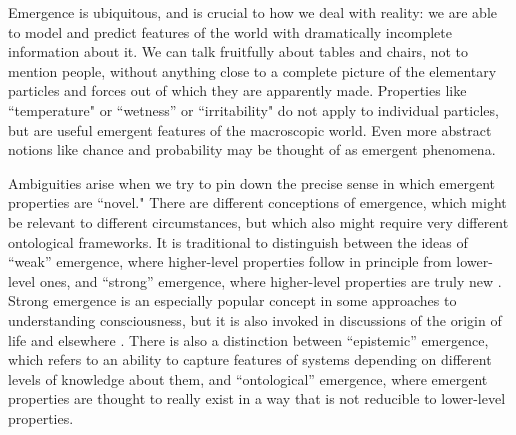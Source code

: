 \documentclass[12pt,english]{article}
\newcommand{\autocite}{\cite}
\begin{document}
Emergence is ubiquitous, and is crucial to how we deal with reality: we are able to model and predict features of the world with dramatically incomplete information about it.
We can talk fruitfully about tables and chairs, not to mention people, without anything close to a complete picture of the elementary particles and forces out of which they are apparently made.
Properties like ``temperature" or ``wetness'' or ``irritability" do not apply to individual particles, but are useful emergent features of the macroscopic world. Even more abstract notions like chance and probability may be thought of as emergent phenomena. \autocite{List2015-LISEC}

Ambiguities arise when we try to pin down the precise sense in which emergent properties are ``novel."
There are different conceptions of emergence, which might be relevant to different circumstances, but which also might require very different ontological frameworks.
It is traditional to distinguish between the ideas of ``weak'' emergence, where higher-level properties follow in principle from lower-level ones, and ``strong'' emergence, where higher-level properties are truly new \autocite{sep-properties-emergent}.
Strong emergence is an especially popular concept in some approaches to understanding consciousness, but it is also invoked in discussions of the origin of life and elsewhere \autocite{Chalmers2006-CHASAW, Tononi2016,Sharma2023}.
There is also a distinction between ``epistemic'' emergence, which refers to an ability to capture features of systems depending on different levels of knowledge about them, and ``ontological'' emergence, where emergent properties are thought to really exist in a way that is not reducible to lower-level properties.
\end{document}
